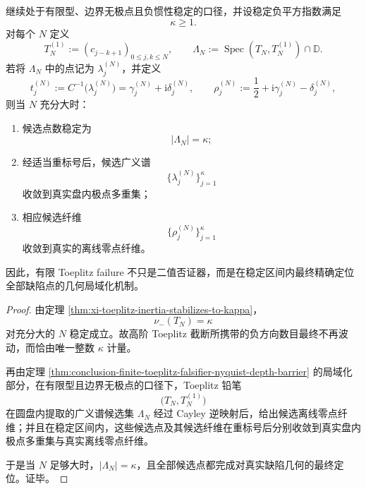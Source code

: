 \begin{theorem}\label{thm:conclusion-toeplitz-failure-complete-geometric-localization}
继续处于有限型、边界无极点且负惯性稳定的口径，并设稳定负平方指数满足
\[
\kappa\ge 1.
\]
对每个 \(N\) 定义
\[
T_N^{(1)}:=(c_{j-k+1})_{0\le j,k\le N},
\qquad
\Lambda_N:=\operatorname{Spec}(T_N,T_N^{(1)})\cap\mathbb D.
\]
若将 \(\Lambda_N\) 中的点记为 \(\lambda_j^{(N)}\)，并定义
\[
t_j^{(N)}:=C^{-1}\!\bigl(\lambda_j^{(N)}\bigr)=\gamma_j^{(N)}+\mathrm i\delta_j^{(N)},
\qquad
\rho_j^{(N)}:=\frac12+\mathrm i\gamma_j^{(N)}-\delta_j^{(N)},
\]
则当 \(N\) 充分大时：
\begin{enumerate}
  \item 候选点数稳定为
  \[
  |\Lambda_N|=\kappa;
  \]
  \item 经适当重标号后，候选广义谱
  \[
  \{\lambda_j^{(N)}\}_{j=1}^{\kappa}
  \]
  收敛到真实盘内极点多重集；
  \item 相应候选纤维
  \[
  \{\rho_j^{(N)}\}_{j=1}^{\kappa}
  \]
  收敛到真实的离线零点纤维。
\end{enumerate}
因此，有限 Toeplitz failure 不只是二值否证器，而是在稳定区间内最终精确定位全部缺陷点的几何局域化机制。
\end{theorem}
\begin{proof}
由定理 \ref{thm:xi-toeplitz-inertia-stabilizes-to-kappa}，
\[
\nu_-(T_N)=\kappa
\]
对充分大的 \(N\) 稳定成立。故高阶 Toeplitz 截断所携带的负方向数目最终不再波动，而恰由唯一整数 \(\kappa\) 计量。

再由定理 \ref{thm:conclusion-finite-toeplitz-falsifier-nyquist-depth-barrier} 的局域化部分，在有限型且边界无极点的口径下，Toeplitz 铅笔
\[
\bigl(T_N,T_N^{(1)}\bigr)
\]
在圆盘内提取的广义谱候选集 \(\Lambda_N\) 经过 Cayley 逆映射后，给出候选离线零点纤维；并且在稳定区间内，这些候选点及其候选纤维在重标号后分别收敛到真实盘内极点多重集与真实离线零点纤维。

于是当 \(N\) 足够大时，\(|\Lambda_N|=\kappa\)，且全部候选点都完成对真实缺陷几何的最终定位。证毕。
\end{proof}

